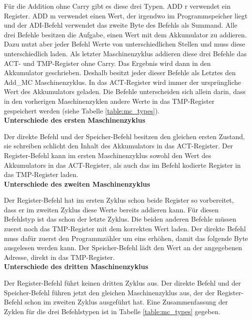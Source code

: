 \documentclass[12pt]{article}
\begin{document}
\noindent
Für die Addition ohne Carry gibt es diese drei Typen. ADD r verwendet ein Register. ADD m verwendet einen Wert, der irgendwo im Programmspeicher liegt und der ADI-Befehl verwendet das zweite Byte des Befehls als Summand. Alle drei Befehle besitzen die Aufgabe, einen Wert mit dem Akkumulator zu addieren. Dazu nutzt aber jeder Befehl Werte von unterschiedlichen Stellen und muss diese unterschiedlich laden. 
Als letzter Maschinenzyklus addieren diese drei Befehle das ACT- und TMP-Register ohne Carry. Das Ergebnis wird dann in den Akkumulator geschrieben. Deshalb besitzt jeder dieser Befehle als Letztes den Add\_MC Maschinenzyklus.
In das ACT-Register wird immer der ursprüngliche Wert des Akkumulators geladen. Die Befehle unterscheiden sich allein darin, dass in den vorherigen Maschinenzyklen andere Werte in das TMP-Register gespeichert werden (siehe Tabelle \ref{table:mc_types}).
\\

\noindent
\textbf{Unterschiede des ersten Maschinenzyklus}

\noindent
Der direkte Befehl und der Speicher-Befehl besitzen den gleichen ersten Zustand, sie schreiben schlicht den Inhalt des Akkumulators in das ACT-Register.
Der Register-Befehl kann im ersten Maschinenzyklus sowohl den Wert des Akkumulators in das ACT-Register, als auch das im Befehl kodierte Register in das TMP-Register laden.
\\

\noindent
\textbf{Unterschiede des zweiten Maschinenzyklus}

\noindent
Der Register-Befehl hat im ersten Zyklus schon beide Register so vorbereitet, dass er im zweiten Zyklus diese Werte bereits addieren kann. Für diesen Befehlstyp ist das schon der letzte Zyklus.
Die beiden anderen Befehle müssen zuerst noch das TMP-Register mit dem korrekten Wert laden. Der direkte Befehl muss dafür zuerst den Programmzähler um eins erhöhen, damit das folgende Byte ausgelesen werden kann. Der Speicher-Befehl lädt den Wert an der angegebenen Adresse, direkt in das TMP-Register.
\\

\noindent
\textbf{Unterschiede des dritten Maschinenzyklus}

\noindent
Der Register-Befehl führt keinen dritten Zyklus aus.
Der direkte Befehl und der Speicher-Befehl führen jetzt den gleichen Maschinenzyklus aus, der der Register-Befehl schon im zweiten Zyklus ausgeführt hat. Eine Zusammenfassung der Zyklen für die drei Befehlstypen ist in Tabelle \ref{table:mc_types} gegeben.
\end{document}
